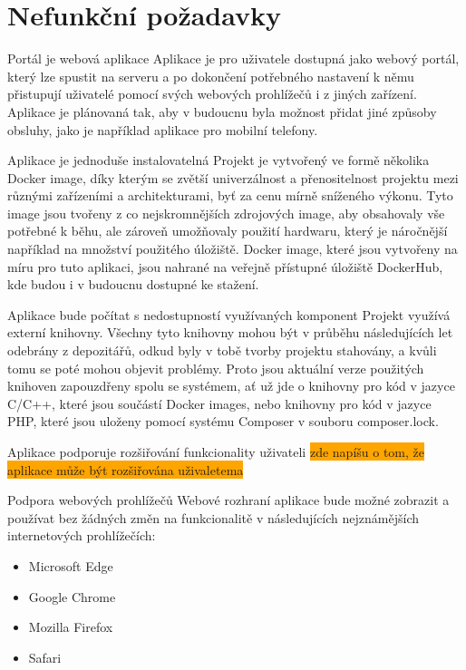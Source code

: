 \section{Nefunkční požadavky}

\def\myprefix{N}
\begin{enumfunctional}[style=nextline]
\item[Portál je webová aplikace]
Aplikace je pro uživatele dostupná jako webový portál, který lze spustit na serveru a po dokončení potřebného nastavení k němu přistupují uživatelé pomocí svých webových prohlížečů i z jiných zařízení. Aplikace je plánovaná tak, aby v budoucnu byla možnost přidat jiné způsoby obsluhy, jako je například aplikace pro mobilní telefony.
\item[Aplikace je jednoduše instalovatelná]
Projekt je vytvořený ve formě několika Docker image, díky kterým se zvětší univerzálnost a přenositelnost projektu mezi různými zařízeními a architekturami, byť za cenu mírně sníženého výkonu. Tyto image jsou tvořeny z co nejskromnějších zdrojových image, aby obsahovaly vše potřebné k běhu, ale zároveň umožňovaly použití hardwaru, který je náročnější například na množství použitého úložiště. Docker image, které jsou vytvořeny na míru pro tuto aplikaci, jsou nahrané na veřejně přístupné úložiště DockerHub, kde budou i v budoucnu dostupné ke stažení.
\item[Aplikace bude počítat s nedostupností využívaných komponent]
Projekt využívá externí knihovny. Všechny tyto knihovny mohou být v průběhu následujících let odebrány z depozitářů, odkud byly v tobě tvorby projektu stahovány, a kvůli tomu se poté mohou objevit problémy. Proto jsou aktuální verze použitých knihoven zapouzdřeny spolu se systémem, ať už jde o knihovny pro kód v jazyce C/C++, které jsou součástí Docker images, nebo knihovny pro kód v jazyce PHP, které jsou uloženy pomocí systému Composer v souboru composer.lock.
\item[Aplikace podporuje rozšiřování funkcionality uživateli]
\colorbox{orange}{zde napíšu o tom, že aplikace může být rozšiřována uživaletema}
\item[Podpora webových prohlížečů]
Webové rozhraní aplikace bude možné zobrazit a používat bez žádných změn na funkcionalitě v následujících nejznámějších internetových prohlížečích:
\begin{itemize}
\item{Microsoft Edge}
\item{Google Chrome}
\item{Mozilla Firefox}
\item{Safari}
\end{itemize}
\end{enumfunctional}

